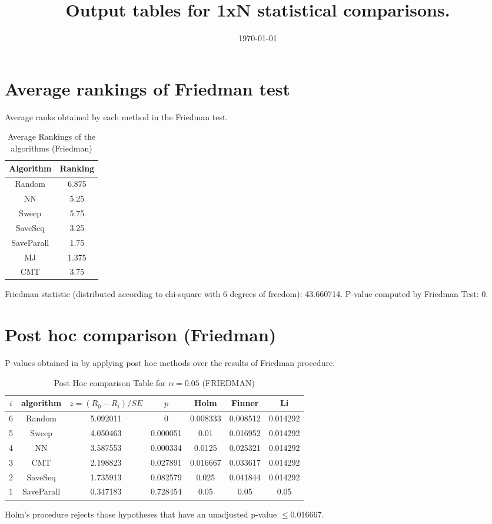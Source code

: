 \documentclass[a4paper,10pt]{article}
\title{Output tables for 1xN statistical comparisons.}
\author{}
\date{\today}
\begin{document}
\begin{landscape}
\pagestyle{empty}
\maketitle
\thispagestyle{empty}

\section{Average rankings of Friedman test}


Average ranks obtained by each method in the Friedman test.

\begin{table}[!htp]
\centering
\begin{tabular}{|c|c|}\hline
Algorithm&Ranking\\\hline
Random&6.875\\NN&5.25\\Sweep&5.75\\SaveSeq&3.25\\SaveParall&1.75\\MJ&1.375\\CMT&3.75\\\hline\end{tabular}
\caption{Average Rankings of the algorithms (Friedman)}
\end{table}

Friedman statistic (distributed according to chi-square with 6 degrees of freedom): 43.660714. \newline P-value computed by Friedman Test: 0.\newline


\newpage

\section{Post hoc comparison (Friedman)}


P-values obtained in by applying post hoc methods over the results of Friedman procedure.

\begin{table}[!htp]
\centering\footnotesize
\begin{tabular}{ccccccc}
$i$&algorithm&$z=(R_0 - R_i)/SE$&$p$&Holm &Finner&Li\\
\hline6&Random&5.092011&0&0.008333&0.008512&0.014292\\5&Sweep&4.050463&0.000051&0.01&0.016952&0.014292\\4&NN&3.587553&0.000334&0.0125&0.025321&0.014292\\3&CMT&2.198823&0.027891&0.016667&0.033617&0.014292\\2&SaveSeq&1.735913&0.082579&0.025&0.041844&0.014292\\1&SaveParall&0.347183&0.728454&0.05&0.05&0.05\\\hline
\end{tabular}
\caption{Post Hoc comparison Table for $\alpha=0.05$ (FRIEDMAN)}
\end{table}Holm's procedure rejects those hypotheses that have an unadjusted p-value $\le0.016667$.


\end{landscape}
\end{document}
